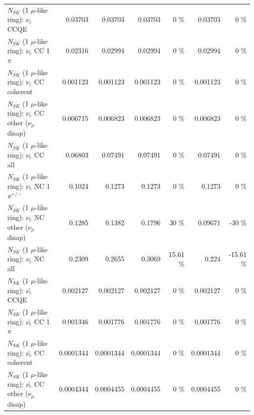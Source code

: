 \begin{table}
\begin{tabular}{| l | r | r | r  r | r  r |}
\hline
\hline
\hline
                                      $N_{SK}$ (1 $\mu$-like ring): $\nu_e$ CCQE &         0.03703 &         0.03703 &         0.03703 &        0 \%  &         0.03703 &        0 \%  \\ 
                                 $N_{SK}$ (1 $\mu$-like ring): $\nu_e$ CC 1$\pi$ &         0.02316 &         0.02994 &         0.02994 &        0 \%  &         0.02994 &        0 \%  \\ 
                               $N_{SK}$ (1 $\mu$-like ring): $\nu_e$ CC coherent &        0.001123 &        0.001123 &        0.001123 &        0 \%  &        0.001123 &        0 \%  \\ 
                $N_{SK}$ (1 $\mu$-like ring): $\nu_e$ CC other ($\nu_\mu$ disap) &        0.006715 &        0.006823 &        0.006823 &        0 \%  &        0.006823 &        0 \%  \\ 
                                  $N_{SK}$ (1 $\mu$-like ring): $\nu_{e}$ CC all &         0.06803 &         0.07491 &         0.07491 &        0 \%  &         0.07491 &        0 \%  \\ 
\hline
                           $N_{SK}$ (1 $\mu$-like ring): $\nu_e$ NC 1$\pi^{+/-}$ &          0.1024 &          0.1273 &          0.1273 &        0 \%  &          0.1273 &        0 \%  \\ 
                $N_{SK}$ (1 $\mu$-like ring): $\nu_e$ NC other ($\nu_\mu$ disap) &          0.1285 &          0.1382 &          0.1796 &       30 \%  &         0.09671 &      -30 \%  \\ 
                                  $N_{SK}$ (1 $\mu$-like ring): $\nu_{e}$ NC all &          0.2309 &          0.2655 &          0.3069 &    15.61 \%  &           0.224 &   -15.61 \%  \\ 
\hline
\hline
\hline
                                $N_{SK}$ (1 $\mu$-like ring): $\bar{\nu_e}$ CCQE &        0.002127 &        0.002127 &        0.002127 &        0 \%  &        0.002127 &        0 \%  \\ 
                           $N_{SK}$ (1 $\mu$-like ring): $\bar{\nu_e}$ CC 1$\pi$ &        0.001346 &        0.001776 &        0.001776 &        0 \%  &        0.001776 &        0 \%  \\ 
                         $N_{SK}$ (1 $\mu$-like ring): $\bar{\nu_e}$ CC coherent &       0.0001344 &       0.0001344 &       0.0001344 &        0 \%  &       0.0001344 &        0 \%  \\ 
          $N_{SK}$ (1 $\mu$-like ring): $\bar{\nu_e}$ CC other ($\nu_\mu$ disap) &       0.0004344 &       0.0004455 &       0.0004455 &        0 \%  &       0.0004455 &        0 \%  \\ 

\end{tabular}
\end{table}
